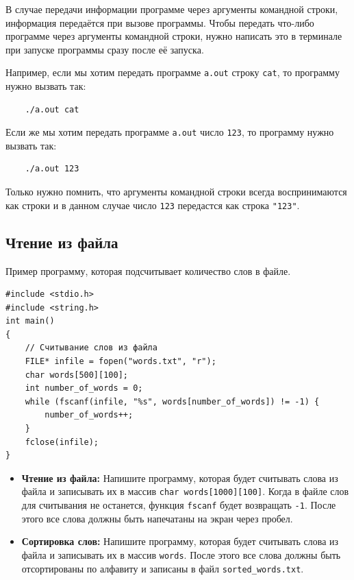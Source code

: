 \documentclass{article}
\begin{document}
В случае передачи информации программе через аргументы командной строки, информация передаётся при вызове 
программы. Чтобы передать что-либо программе через аргументы командной строки, нужно
написать это в терминале при запуске программы сразу после её запуска.

Например, если мы хотим передать программе \texttt{a.out} строку \texttt{cat}, то программу нужно вызвать так:
\begin{verbatim}
    ./a.out cat
\end{verbatim}

Если же мы хотим передать программе \texttt{a.out} число \texttt{123}, то программу нужно вызвать так:
\begin{verbatim}
    ./a.out 123
\end{verbatim}
Только нужно помнить, что аргументы командной строки всегда воспринимаются как строки и в данном случае 
число \texttt{123} передастся как строка \texttt{"123"}.

\newpage


\subsection*{Чтение из файла}
Пример программу, которая подсчитывает количество слов в файле.
\begin{lstlisting}
#include <stdio.h>
#include <string.h>
int main() 
{
	// Считывание слов из файла
	FILE* infile = fopen("words.txt", "r");
	char words[500][100];
	int number_of_words = 0;
	while (fscanf(infile, "%s", words[number_of_words]) != -1) {
		number_of_words++;
	}
	fclose(infile);
}
\end{lstlisting}
\begin{itemize}
\item \textbf{Чтение из файла:} Напишите программу, которая будет считывать слова из файла и записывать их в массив \texttt{char words[1000][100]}. Когда в файле слов для считывания не останется, функция \texttt{fscanf} будет возвращать \texttt{-1}. После этого все слова должны быть напечатаны на экран через пробел. 
\item \textbf{Сортировка слов:} Напишите программу, которая будет считывать слова из файла и записывать их в массив \texttt{words}. После этого все слова должны быть отсортированы по алфавиту и записаны в файл \texttt{sorted\_words.txt}.
\end{itemize}
\end{document}
